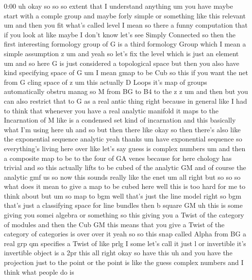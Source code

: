 \begin{unfinished}{0:00}
uh  okay  so  so  so  extent  that  I
understand  anything  um  you  have  maybe
start  with  a  comple
group  and  maybe  forly  simple  or
something  like
this  relevant
um  and  then  you
fit  what's  called
level  I  mean  so  there  a  funny
computation  that  if  you  look
at  like  maybe  I  don't  know  let's  see
Simply  Connected  so  then  the  first
interesting  formology  group  of  G  is  a
third  formology  Group  which  I  mean  a
simple  assumption  z  um  and  yeah  so  let's
fix  the  level  which  is  just  an
element  um
and  so  here  G  is  just  considered  a
topological  space  but  then  you  also  have
kind  specifying  space  of  G
um  I  mean  gmap  to  be  Cub  so  this  if  you
want  the  net  from
G  cling  space  of  z  um  this  actually  D
Loops  it's  map  of  groups  automatically
obstru  manag  so  M
from  BG  to  B4  to  the  z  z
um  and
then  but  you  can  also  restrict  that  to  G
as  a  real  antic
thing
right  because  in  general  like  I  had  to
think  that  whenever  you  have  a  real
analytic  manifold  it  maps  to  the
Incarnation  of  M  like  is  a  condensed  set
kind  of
incarnation  and  this  basically  what  I'm
using
here  uh  and
so  but  then  there  like  okay  so  then
there's
also  like  the  exponential
sequence  analytic
yeah
thanks  um  have  exponential  sequence  so
everything's  living  here  over  like  let's
say  guess  is  complex  numbers  um  and  then
a  composite  map  to  be  to  the  four
of  GA  venes  because  for  here  chology  has
trivial  and  so  this  actually  lifts  to  be
cubed  of  the  analytic
GM  and  of  course  the  analytic  gmf  us
so  now  this  sounds  really  like  the  enet
um
all  right  but  so  so  so  what  does  it  mean
to  give  a  map  to  be  cubed
here  well  this  is  too  hard  for  me  to
think  about  but  um  so  map  to  bgm  well
that's  just  the  line  model  right  so  bgm
that's  just  a  classifying  space  for  line
bundles  then  b  square  GM  uh  this  is  some
giving  you  somei  algebra  or  something  so
this  giving  you  a  Twist  of  the  category
of  modules  and  then  the  Cub  GM  this
means  that  you  give  a  Twist  of  the
category  of  categories  is  over  over  it
yeah
so  so  this  snap  called  Alpha  from
BG  a  real  grp
qm
specifies  a
Twist  of  like
prlg  I  some  let's  call  it  just  l  or
invertible  it's  invertible  object  is  a
2pr
this  all  right  okay  so  have  this  uh  and
you  have  the  projection  just  to  the
point  or  the  point  is  like  the  guess
complex
numbers  and  I  think  what  people  do  is

\end{unfinished}
